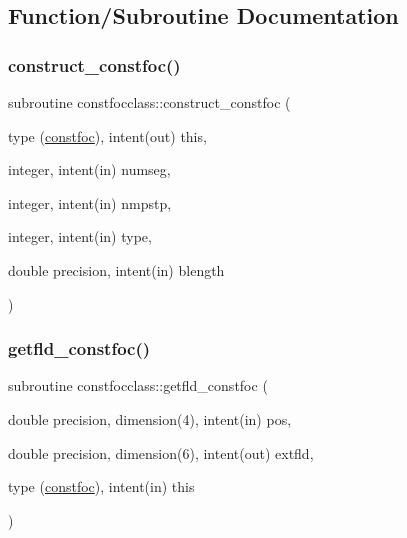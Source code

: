 \subsection{Function/\+Subroutine Documentation}
\mbox{\label{namespaceconstfocclass_a36197970c1524c85aeaea51d39f0ede7}} 
\subsubsection{\texorpdfstring{construct\_constfoc()}{construct\_constfoc()}}
{\footnotesize\ttfamily subroutine constfocclass\+::construct\+\_\+constfoc (\begin{DoxyParamCaption}\item[{type (\mbox{\hyperlink{namespaceconstfocclass_structconstfocclass_1_1constfoc}{constfoc}}), intent(out)}]{this,  }\item[{integer, intent(in)}]{numseg,  }\item[{integer, intent(in)}]{nmpstp,  }\item[{integer, intent(in)}]{type,  }\item[{double precision, intent(in)}]{blength }\end{DoxyParamCaption})}

\mbox{\label{namespaceconstfocclass_a34425bf98b4a4cff016108f25a629dff}} 
\subsubsection{\texorpdfstring{getfld\_constfoc()}{getfld\_constfoc()}}
{\footnotesize\ttfamily subroutine constfocclass\+::getfld\+\_\+constfoc (\begin{DoxyParamCaption}\item[{double precision, dimension(4), intent(in)}]{pos,  }\item[{double precision, dimension(6), intent(out)}]{extfld,  }\item[{type (\mbox{\hyperlink{namespaceconstfocclass_structconstfocclass_1_1constfoc}{constfoc}}), intent(in)}]{this }\end{DoxyParamCaption})}

